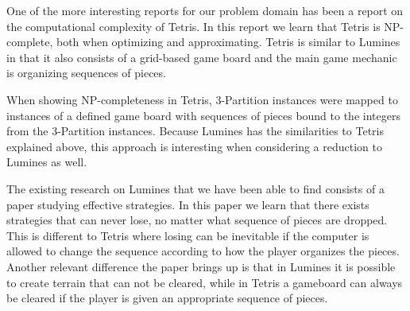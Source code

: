 One of the more interesting reports for our problem domain has been a report on the computational complexity of Tetris. In this report we learn that Tetris is NP-complete,  both when optimizing and approximating. Tetris is similar to Lumines in that it also consists of a grid-based game board and the main game mechanic is organizing sequences of pieces.

When showing NP-completeness in Tetris, 3-Partition instances were mapped to instances of a defined game board with sequences of pieces bound to the integers from the 3-Partition instances. Because Lumines has the similarities to Tetris explained above, this approach is interesting when considering a reduction to Lumines as well.

The existing research on Lumines that we have been able to find consists of a paper studying effective strategies. In this paper we learn that there exists strategies that can never lose, no matter what sequence of pieces are dropped. This is different to Tetris where losing can be inevitable if the computer is allowed to change the sequence according to how the player organizes the pieces. Another relevant difference the paper brings up is that in Lumines it is possible to create terrain that can not be cleared, while in Tetris a gameboard can always be cleared if the player is given an appropriate sequence of pieces.
